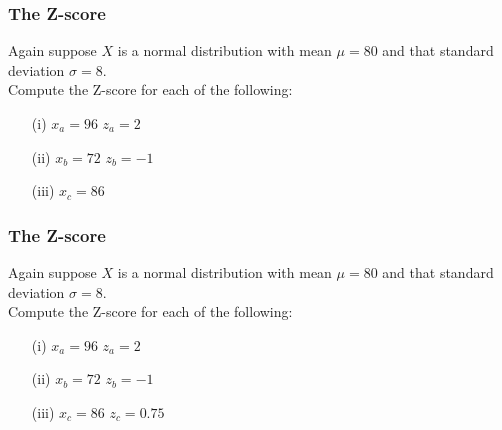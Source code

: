\documentclass[a4]{beamer}
\begin{document}
\begin{frame}
\frametitle{The Z-score}
\Large
\vspace{-1cm}
Again suppose $X$ is a normal distribution with mean $\mu = 80 $ and that standard deviation $\sigma = 8$. \\ \vspace{0.5cm} Compute the Z-score for each of the following:
\begin{itemize}
\item[(i)] $x_a = 96$  \phantom{space} $z_a = 2$ \vspace{0.2cm}
\item[(ii)] $x_b = 72$  \phantom{space} $z_b = -1$ \vspace{0.2cm}
\item[(iii)] $x_c = 86$  %
\end{itemize}
\end{frame}
\begin{frame}
\frametitle{The Z-score}
\Large
\vspace{-1cm}
Again suppose $X$ is a normal distribution with mean $\mu = 80 $ and that standard deviation $\sigma = 8$. \\ \vspace{0.5cm} Compute the Z-score for each of the following:
\begin{itemize}
\item[(i)] $x_a = 96$  \phantom{space} $z_a = 2$ \vspace{0.2cm}
\item[(ii)] $x_b = 72$  \phantom{space} $z_b = -1$ \vspace{0.2cm}
\item[(iii)] $x_c = 86$  \phantom{space} $z_c = 0.75$
\end{itemize}
\end{frame}
\end{document}
